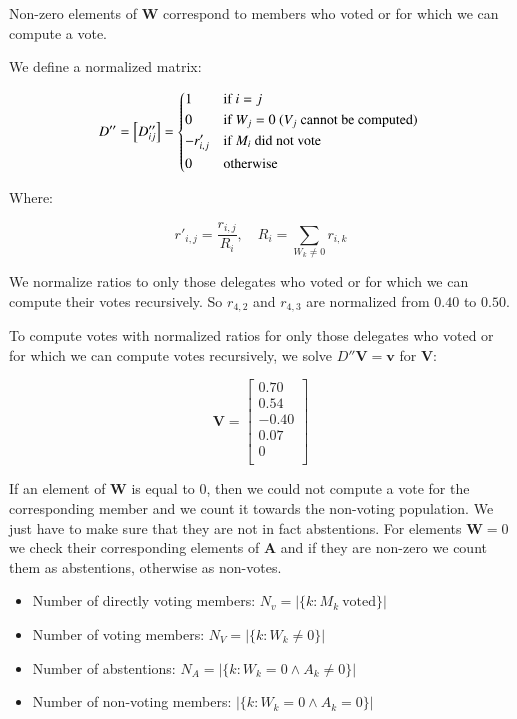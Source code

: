 \documentclass{sigchi}
\begin{document}
Non-zero elements of $\boldsymbol{W}$ correspond to members who voted or for which we can compute
a vote.

We define a normalized matrix:

\begin{displaymath}
D'' = \left[D''_{ij}\right] = \begin{dcases*}
 1 & if $i = j$ \\
 0 & if $W_j = 0$ ($V_j$ cannot be computed) \\
 -r'_{i,j} & if $M_i$ did not vote \\
 0 & otherwise \\
\end{dcases*}
\end{displaymath}

Where:

\begin{displaymath}
r'_{i,j} = \frac{r_{i,j}}{R_i},\quad R_i = \sum_{W_k \ne 0} r_{i,k}
\end{displaymath}

We normalize ratios to only those delegates who voted or for which we can
compute their votes recursively.
So $r_{4,2}$ and $r_{4,3}$ are normalized from $0.40$ to $0.50$.

To compute votes with normalized ratios for only those delegates who voted or for which we can compute votes recursively,
we solve $D'' \boldsymbol{V} = \boldsymbol{v}$ for $\boldsymbol{V}$:

\begin{displaymath}
\mathbf{V} = \left[ \begin{array}{c}
0.70 \\
0.54 \\
-0.40 \\
0.07 \\
0 \\
\end{array} \right]
\end{displaymath}

If an element of $\boldsymbol{W}$ is equal to $0$, then we could not compute a vote for the corresponding
member and we count it towards the non-voting population.
We just have to make sure that they are not in fact abstentions.
For elements $\boldsymbol{W} = 0$ we check their corresponding elements of $\boldsymbol{A}$ and if they are
non-zero we count them as abstentions, otherwise as non-votes.

\begin{itemize}
\item Number of directly voting members: $N_v = \left| \{ k: M_k~\mathrm{voted} \} \right|$
\item Number of voting members: $N_V = \left| \{ k: W_k \ne 0 \} \right|$
\item Number of abstentions: $N_A = \left| \{ k:  W_k = 0 \land A_k \ne 0 \} \right|$
\item Number of non-voting members: $\left| \{ k: W_k = 0 \land A_k = 0 \} \right|$
\end{itemize}
\end{document}
